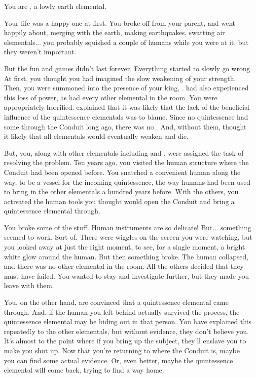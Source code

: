 \documentclass[char]{elementals}
\begin{document}
\name{\cMinion{}}

You are \cMinion{\intro}, a lowly earth elemental.

Your life was a happy one at first.  You broke off from your parent, and went happily about, merging with the earth, making earthquakes, swatting air elementals... you probably squished a couple of humans while you were at it, but they weren't important.

But the fun and games didn't last forever.  Everything started to slowly go wrong.  At first, you thought you had imagined the slow weakening of your strength.  Then, you were summoned into the presence of your king, \cEarthKing{}.  \cEarthKing{\They} had also experienced this loss of power, as had every other elemental in the room.  You were appropriately horrified.  \cEarthKing{} explained that it was likely that the lack of the beneficial influence of the quintessence elementals was to blame.  Since no quintessence had some through the Conduit long ago, there was no \iWhite{}.  And, without them, \cEarthKing{} thought it likely that all elementals would eventually weaken and die.

But, you, along with other elementals including \cLoyal{} and \cRogue{}, were assigned the task of resolving the problem.  Ten years ago, you visited the human structure where the Conduit had been opened before.  You snatched a convenient human along the way, to be a vessel for the incoming quintessence, the way humans had been used to bring in the other elementals a hundred years before.  With the others, you activated the human tools you thought would open the Conduit and bring a quintessence elemental through.

You broke some of the stuff.  Human instruments are so delicate!  But... something seemed to work.  Sort of.  There were wiggles on the screen you were watching, but you looked away at just the right moment, to see, for a single moment, a bright white glow around the human.  But then something broke.  The human collapsed, and there was no other elemental in the room.  All the others decided that they must have failed.  You wanted to stay and investigate further, but they made you leave with them.

You, on the other hand, are convinced that a quintessence elemental came through.  And, if the human you left behind actually survived the process, the quintessence elemental may be hiding out in that person.  You have explained this repeatedly to the other elementals, but without evidence, they don't believe you.  It's almost to the point where if you bring up the subject, they'll enslave you to make you shut up.  Now that you're returning to where the Conduit is, maybe you can find some actual evidence.  Or, even better, maybe the quintessence elemental will come back, trying to find a way home.
\end{document}
